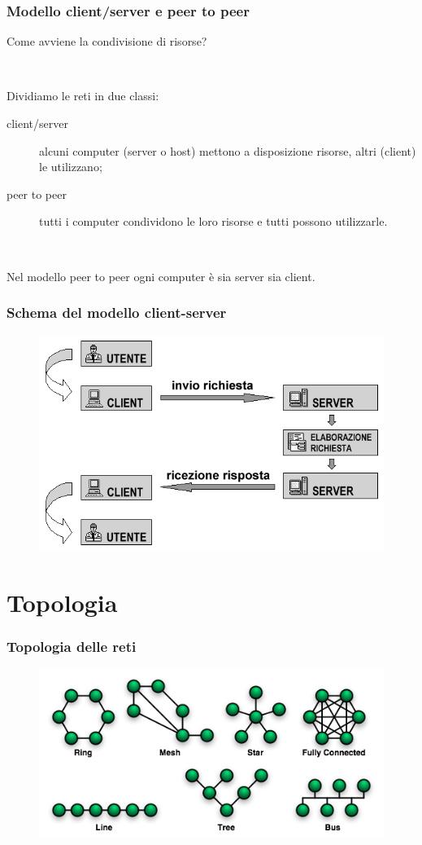 \documentclass[handout]{beamer}
\begin{document}
\begin{frame}
\frametitle{Modello client/server e peer to peer}
Come avviene la condivisione di risorse?\pause

~

Dividiamo le reti in due classi:
\begin{description}
  \item[client/server] alcuni computer (server o host) mettono a disposizione risorse, altri (client) le utilizzano;\pause
  \item[peer to peer] tutti i computer condividono le loro risorse e tutti possono utilizzarle.\pause
\end{description}

~

Nel modello peer to peer ogni computer è sia server sia client.
\end{frame}

\begin{frame}
\frametitle{Schema del modello client-server}
\begin{figure}
\includegraphics[width=.7\columnwidth]{screenshots/clientserver.png}
\end{figure}
\end{frame}


\section{Topologia}


\begin{frame}
\frametitle{Topologia delle reti}
\begin{figure}
\includegraphics[width=.7\columnwidth]{screenshots/reti.png}
\end{figure}
\end{frame}
\end{document}
